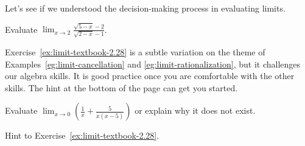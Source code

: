 \documentclass[../main.tex]{subfiles}
\begin{document}
Let's see if we understood the decision-making process in evaluating limits.
\begin{exercise}
  Evaluate \(\lim_{x \to 2} \frac{\sqrt{5 - x} - 2}{\sqrt{2 - x} - 1}\).

  \blanks*
\end{exercise}
\clearpage


Exercise~\ref{ex:limit-textbook-2.28} is a subtle variation on the theme of Examples~\ref{eg:limit-cancellation} and \ref{eg:limit-rationalization}, but it challenges our algebra skills. It is good practice once you are comfortable with the other skills. The hint at the bottom of the page can get you started.
\begin{exercise} \label{ex:limit-textbook-2.28}
  Evaluate \(\lim_{x \to 0} \left( \frac{1}{x} + \frac{5}{x(x-5)}\right)\) or explain why it does not exist.

\end{exercise}

\vfill{}
{\scriptsize Hint to Exercise~\ref{ex:limit-textbook-2.28}}. \newline
{}
\clearpage
\end{document}
